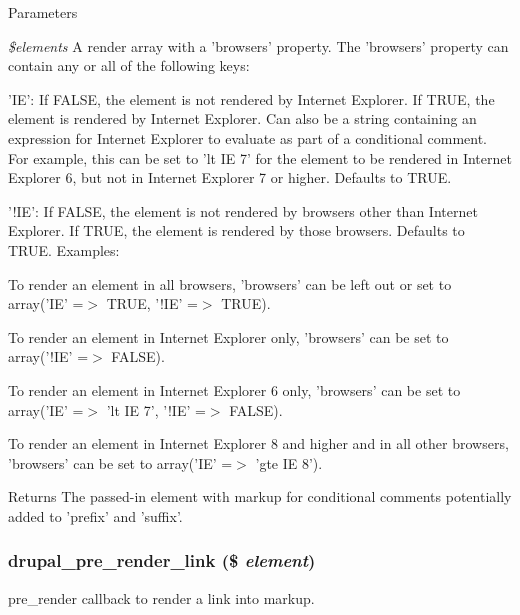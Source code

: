 \begin{DoxyParams}{Parameters}
\item[{\em \$elements}]A render array with a 'browsers' property. The 'browsers' property can contain any or all of the following keys:
\begin{DoxyItemize}
\item 'IE': If FALSE, the element is not rendered by Internet Explorer. If TRUE, the element is rendered by Internet Explorer. Can also be a string containing an expression for Internet Explorer to evaluate as part of a conditional comment. For example, this can be set to 'lt IE 7' for the element to be rendered in Internet Explorer 6, but not in Internet Explorer 7 or higher. Defaults to TRUE.
\item '!IE': If FALSE, the element is not rendered by browsers other than Internet Explorer. If TRUE, the element is rendered by those browsers. Defaults to TRUE. Examples:
\item To render an element in all browsers, 'browsers' can be left out or set to array('IE' =$>$ TRUE, '!IE' =$>$ TRUE).
\item To render an element in Internet Explorer only, 'browsers' can be set to array('!IE' =$>$ FALSE).
\item To render an element in Internet Explorer 6 only, 'browsers' can be set to array('IE' =$>$ 'lt IE 7', '!IE' =$>$ FALSE).
\item To render an element in Internet Explorer 8 and higher and in all other browsers, 'browsers' can be set to array('IE' =$>$ 'gte IE 8').
\end{DoxyItemize}\end{DoxyParams}
\begin{DoxyReturn}{Returns}
The passed-\/in element with markup for conditional comments potentially added to 'prefix' and 'suffix'. 
\end{DoxyReturn}
\hypertarget{common_8inc_a58664756a8b7d1e1d3765a54057c6d8b}{
\subsubsection[{drupal\_\-pre\_\-render\_\-link}]{\setlength{\rightskip}{0pt plus 5cm}drupal\_\-pre\_\-render\_\-link (\$ {\em element})}}
\label{common_8inc_a58664756a8b7d1e1d3765a54057c6d8b}
pre\_\-render callback to render a link into markup.

